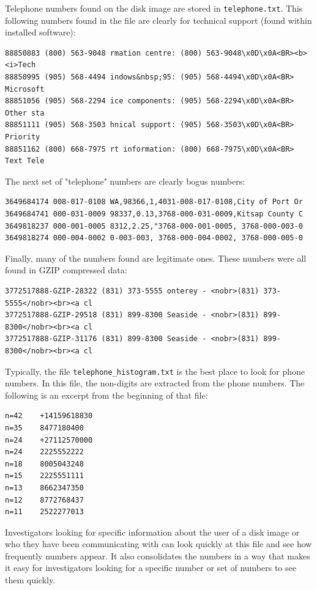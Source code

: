 Telephone numbers found on the disk image are stored in \texttt{telephone.txt}. This following numbers found in the file are clearly for technical support (found within installed software):
\lstset{style=customfile}
\begin{lstlisting}
88850883 (800) 563-9048 rmation centre: (800) 563-9048\x0D\x0A<BR><b><i>Tech
88850995 (905) 568-4494 indows&nbsp;95: (905) 568-4494\x0D\x0A<BR> Microsoft
88851056 (905) 568-2294 ice components: (905) 568-2294\x0D\x0A<BR> Other sta
88851111 (905) 568-3503 hnical support: (905) 568-3503\x0D\x0A<BR> Priority 
88851162 (800) 668-7975 rt information: (800) 668-7975\x0D\x0A<BR> Text Tele
\end{lstlisting}
The next set of "telephone" numbers are clearly bogus numbers:
\lstset{style=customfile}
\begin{lstlisting}
3649684174 008-017-0108 WA,98366,1,4031-008-017-0108,City of Port Or
3649684741 000-031-0009 98337,0.13,3768-000-031-0009,Kitsap County C
3649818237 000-001-0005 8312,2.25,"3768-000-001-0005, 3768-000-003-0
3649818274 000-004-0002 0-003-003, 3768-000-004-0002, 3768-000-005-0
\end{lstlisting}
Finally, many of the numbers found are legitimate ones. These numbers were all found in GZIP compressed data:
\lstset{style=customfile}
\begin{lstlisting}
3772517888-GZIP-28322 (831) 373-5555 onterey - <nobr>(831) 373-5555</nobr><br><a cl
3772517888-GZIP-29518 (831) 899-8300 Seaside - <nobr>(831) 899-8300</nobr><br><a cl
3772517888-GZIP-31176 (831) 899-8300 Seaside - <nobr>(831) 899-8300</nobr><br><a cl
\end{lstlisting}
Typically, the file \texttt{telephone\_histogram.txt} is the best place to look for phone numbers. In this file, the non-digits are extracted from the phone numbers. The following is an excerpt from the beginning of that file:
\lstset{style=customfile}
\begin{lstlisting}
n=42	+14159618830
n=35	8477180400
n=24	+27112570000
n=24	2225552222
n=18	8005043248
n=15	2225551111
n=13	8662347350
n=12	8772768437
n=11	2522277013
\end{lstlisting}
Investigators looking for specific information about the user of a disk image or who they have been communicating with can look quickly at this file and see how frequently numbers appear. It also consolidates the numbers in a way that makes it easy for investigators looking for a specific number or set of numbers to see them quickly.\\

